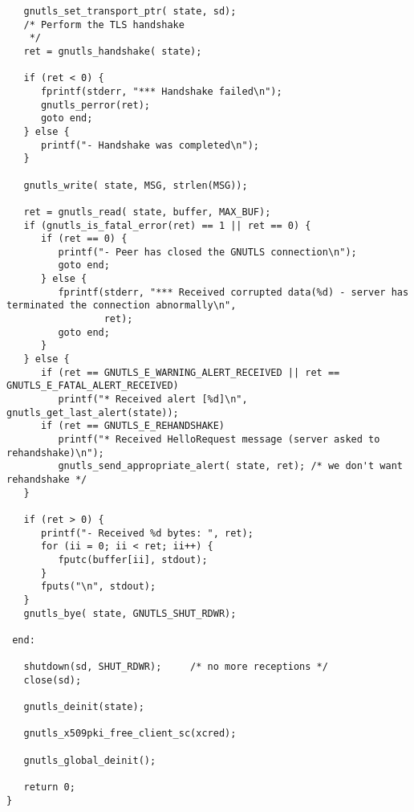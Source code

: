 \begin{verbatim}
   gnutls_set_transport_ptr( state, sd);
   /* Perform the TLS handshake
    */
   ret = gnutls_handshake( state);

   if (ret < 0) {
      fprintf(stderr, "*** Handshake failed\n");
      gnutls_perror(ret);
      goto end;
   } else {
      printf("- Handshake was completed\n");
   }

   gnutls_write( state, MSG, strlen(MSG));

   ret = gnutls_read( state, buffer, MAX_BUF);
   if (gnutls_is_fatal_error(ret) == 1 || ret == 0) {
      if (ret == 0) {
         printf("- Peer has closed the GNUTLS connection\n");
         goto end;
      } else {
         fprintf(stderr, "*** Received corrupted data(%d) - server has terminated the connection abnormally\n",
                 ret);
         goto end;
      }
   } else {
      if (ret == GNUTLS_E_WARNING_ALERT_RECEIVED || ret == GNUTLS_E_FATAL_ALERT_RECEIVED)
         printf("* Received alert [%d]\n", gnutls_get_last_alert(state));
      if (ret == GNUTLS_E_REHANDSHAKE)
         printf("* Received HelloRequest message (server asked to rehandshake)\n");
         gnutls_send_appropriate_alert( state, ret); /* we don't want rehandshake */
   }

   if (ret > 0) {
      printf("- Received %d bytes: ", ret);
      for (ii = 0; ii < ret; ii++) {
         fputc(buffer[ii], stdout);
      }
      fputs("\n", stdout);
   }
   gnutls_bye( state, GNUTLS_SHUT_RDWR);

 end:

   shutdown(sd, SHUT_RDWR);     /* no more receptions */
   close(sd);

   gnutls_deinit(state);

   gnutls_x509pki_free_client_sc(xcred);

   gnutls_global_deinit();

   return 0;
}

\end{verbatim}
